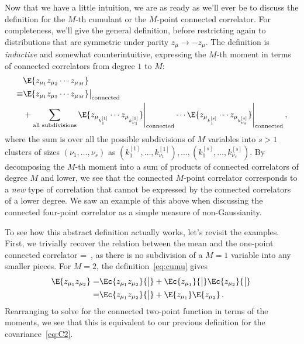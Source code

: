 Now that we have a little intuition, we are as ready as we'll ever be to discuss the definition for the $M$-th cumulant or the $M$-point connected  correlator. For completeness, we'll give the general definition, before restricting again to distributions that are symmetric under parity $z_\mu \to - z_\mu$. 
The definition is \emph{inductive} and somewhat counterintuitive, expressing the $M$-th moment in terms of connected correlators from degree $1$ to $M$: 
\begin{align}\label{eq:cumu}
&\E{z_{\mu_1} z_{\mu_2}\cdots z_{\mu_{M} }}\, \\
\equiv&\E{z_{\mu_1} z_{\mu_2}\cdots z_{\mu_{M}}}\big|_{\text{connected}}\, \nonumber\\
&+\sum_{\text{all\ subdivisions}}\E{z_{\mu_{k^{[1]}_1}}\cdots z_{\mu_{k^{[1]}_{\nu_1}}}}\Bigg|_{\text{connected}}\cdots\E{z_{\mu_{k^{[s]}_1}} \cdots z_{\mu_{k^{[s]}_{\nu_s}}}}\Bigg|_{\text{connected}}\, , \nonumber
\end{align}
where the sum is over all the possible subdivisions of $M$ variables into $s>1$ clusters of sizes $(\nu_1,\ldots,\nu_s)$ as $(k^{[1]}_1,\ldots,k^{[1]}_{\nu_1}),\ldots,(k^{[s]}_1,\ldots,k^{[s]}_{\nu_s})$. 
By decomposing the $M$-th moment into a sum of products of connected correlators of degree $M$ and lower, we see that the connected $M$-point correlator corresponds to a \emph{new} type of correlation that cannot be expressed by the connected correlators of a lower degree. We saw an example of this above when discussing the connected four-point correlator as a simple measure of non-Gaussianity.





To see how this abstract definition actually works, let's revisit the examples. First, we trivially recover the relation between the mean and the one-point connected correlator
\be
{}=\, ,
\ee
as there is no subdivision of a $M=1$ variable into any smaller pieces. For $M=2$, the definition~\eqref{eq:cumu} gives
\begin{align}
\E{z_{\mu_1}z_{\mu_2}}=&\Ec{z_{\mu_1} z_{\mu_2}}{\big|}+\Ec{z_{\mu_1}}{\big|}\Ec{z_{\mu_2}}{\big|}\, \\
=&\Ec{z_{\mu_1} z_{\mu_2}}{\big|}+\E{z_{\mu_1}}\E{z_{\mu_2}}\, .\nonumber
\end{align}
Rearranging to solve for the connected two-point function in terms of the moments, we see that this
is equivalent to our previous definition for the covariance~\eqref{eq:C2}. %

